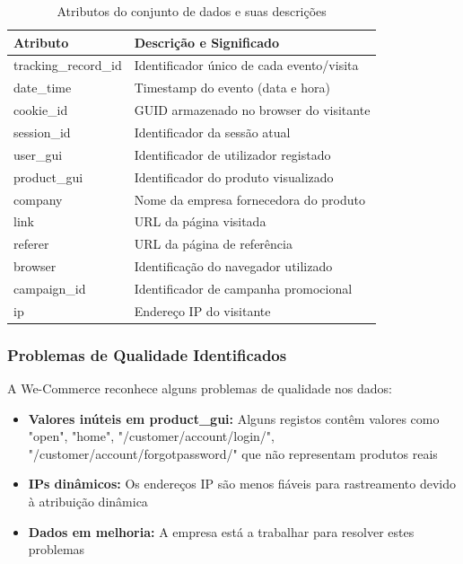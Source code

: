 \documentclass[11pt,a4paper]{article}
\begin{document}
\begin{table}[H]
\centering
\begin{tabular}{@{}ll@{}}
\toprule
\textbf{Atributo} & \textbf{Descrição e Significado} \\ \midrule
tracking\_record\_id & Identificador único de cada evento/visita \\
date\_time & Timestamp do evento (data e hora) \\
cookie\_id & GUID armazenado no browser do visitante \\
session\_id & Identificador da sessão atual \\
user\_gui & Identificador de utilizador registado \\
product\_gui & Identificador do produto visualizado \\
company & Nome da empresa fornecedora do produto \\
link & URL da página visitada \\
referer & URL da página de referência \\
browser & Identificação do navegador utilizado \\
campaign\_id & Identificador de campanha promocional \\
ip & Endereço IP do visitante \\ \bottomrule
\end{tabular}
\caption{Atributos do conjunto de dados e suas descrições}
\label{tab:atributos}
\end{table}

\subsubsection{Problemas de Qualidade Identificados}

A We-Commerce reconhece alguns problemas de qualidade nos dados:

\begin{itemize}
    \item \textbf{Valores inúteis em product\_gui:} Alguns registos contêm valores como "open", "home", "/customer/account/login/", "/customer/account/forgotpassword/" que não representam produtos reais
    \item \textbf{IPs dinâmicos:} Os endereços IP são menos fiáveis para rastreamento devido à atribuição dinâmica
    \item \textbf{Dados em melhoria:} A empresa está a trabalhar para resolver estes problemas
\end{itemize}
\end{document}
